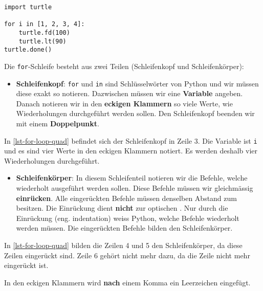 \begin{lstlisting}[caption={Zeile vier und fünf wird jeweils viermal ausgeführt (\graybgtexttt{quadrat\_loop.py}).}, label=lst-for-loop-quad]
import turtle

for i in [1, 2, 3, 4]:
    turtle.fd(100)
    turtle.lt(90)
turtle.done()
\end{lstlisting}

Die \lstinline{for}-Schleife besteht aus zwei Teilen (Schleifenkopf und Schleifenkörper):

\begin{itemize}
	\item \textbf{Schleifenkopf}: \lstinline{for} und \lstinline{in} sind Schlüsselwörter von Python und wir müssen diese exakt so notieren. Dazwischen müssen wir eine \textbf{Variable} angeben. Danach notieren wir in den \textbf{eckigen Klammern} so viele Werte, wie Wiederholungen durchgeführt werden sollen. Den Schleifenkopf beenden wir mit einem \textbf{Doppelpunkt}.
\end{itemize}

\begin{example}
	In \autoref{lst-for-loop-quad} befindet sich der Schleifenkopf in Zeile $3$. Die Variable ist \lstinline{i} und es sind vier Werte in den eckigen Klammern notiert. Es werden deshalb vier Wiederholungen durchgeführt.
\end{example}

\begin{itemize}
	\item \textbf{Schleifenkörper}: In diesem Schleifenteil notieren wir die Befehle, welche wiederholt ausgeführt werden sollen. Diese Befehle müssen wir gleichmässig \textbf{einrücken}. Alle eingerückten Befehle müssen denselben Abstand zum  besitzen. Die Einrückung dient \textbf{nicht} zur optischen . Nur durch die Einrückung (eng. indentation) weiss Python, welche Befehle wiederholt werden müssen. Die eingerückten Befehle bilden den Schleifenkörper.
\end{itemize}

\begin{example}
	In \autoref{lst-for-loop-quad} bilden die Zeilen \num{4} und \num{5} den Schleifenkörper, da diese Zeilen eingerückt sind. Zeile \num{6} gehört nicht mehr dazu, da die Zeile nicht mehr eingerückt ist.
\end{example}

\begin{cleancode}[Leerzeichen 2]
In den eckigen Klammern wird \textbf{nach} einem Komma ein Leerzeichen eingefügt.
\end{cleancode}

